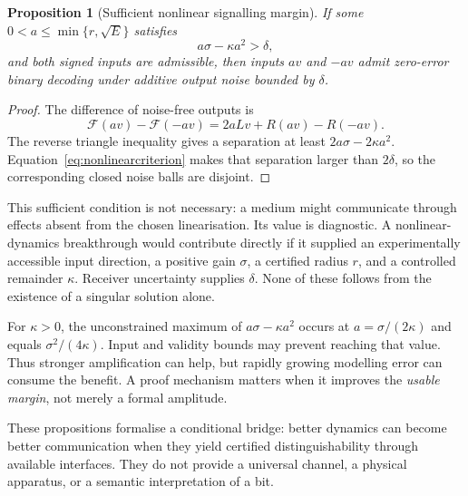 \documentclass[11pt,a4paper]{article}
\newtheorem{proposition}[theorem]{Proposition}
\theoremstyle{definition}
\theoremstyle{remark}
\begin{document}
\begin{proposition}[Sufficient nonlinear signalling margin]\label{prop:nonlinearbit}
If some $0<a\leq\min\{r,\sqrt E\}$ satisfies
\begin{equation}\label{eq:nonlinearcriterion}
 a\sigma-\kappa a^2>\delta,
\end{equation}
and both signed inputs are admissible, then inputs $av$ and $-av$ admit zero-error binary decoding under additive output noise bounded by $\delta$.
\end{proposition}
\begin{proof}
The difference of noise-free outputs is
\[
 \mathcal F(av)-\mathcal F(-av)=2aLv+R(av)-R(-av).
\]
The reverse triangle inequality gives a separation at least $2a\sigma-2\kappa a^2$. Equation~\eqref{eq:nonlinearcriterion} makes that separation larger than $2\delta$, so the corresponding closed noise balls are disjoint.
\end{proof}
This sufficient condition is not necessary: a medium might communicate through effects absent from the chosen linearisation. Its value is diagnostic. A nonlinear-dynamics breakthrough would contribute directly if it supplied an experimentally accessible input direction, a positive gain $\sigma$, a certified radius $r$, and a controlled remainder $\kappa$. Receiver uncertainty supplies $\delta$. None of these follows from the existence of a singular solution alone.

For $\kappa>0$, the unconstrained maximum of $a\sigma-\kappa a^2$ occurs at $a=\sigma/(2\kappa)$ and equals $\sigma^2/(4\kappa)$. Input and validity bounds may prevent reaching that value. Thus stronger amplification can help, but rapidly growing modelling error can consume the benefit. A proof mechanism matters when it improves the \emph{usable margin}, not merely a formal amplitude.

These propositions formalise a conditional bridge: better dynamics can become better communication when they yield certified distinguishability through available interfaces. They do not provide a universal channel, a physical apparatus, or a semantic interpretation of a bit.
\end{document}
